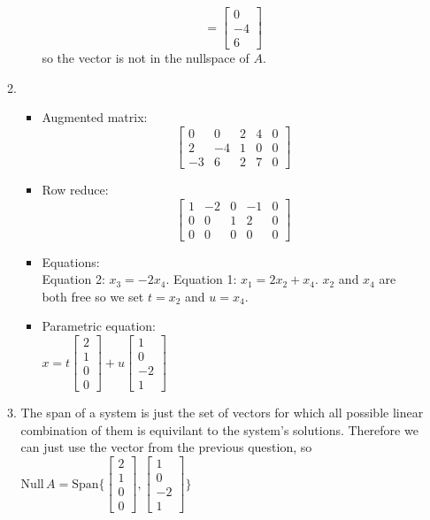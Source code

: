 \documentclass[12pt,a4paper]{exam}
\newcommand{\Nul}{\mathrm{Null\,}}
\newcommand{\Span}{\mathrm{Span}}
\begin{document}
\begin{enumerate}
\begin{solution}
\begin{enumerate}
\begin{enumerate}
\[          =
          \left[\begin{matrix} 0 \\ -4 \\ 6 \end{matrix}\right]
          \] so the vector is not in the nullspace of $A$.
      \end{enumerate}
    \item
    \begin{itemize}
      \item Augmented matrix:\\
        \[ \left[ \begin{matrix}
            0 & 0 & 2 & 4 & 0\\
            2 & -4 & 1 & 0 & 0\\
            -3 & 6 & 2 & 7 & 0
         \end{matrix} \right] \]
      \item Row reduce:\\
        \[ \left[ \begin{matrix}
            1 & -2 & 0 & -1 & 0\\
            0 & 0 & 1 & 2 & 0\\
            0 & 0 & 0 & 0 & 0
         \end{matrix} \right] \]
      \item Equations:\\
        Equation 2: $x_3=-2x_4$. 
        Equation 1: $x_1=2x_2+x_4$. 
        $x_2$ and $x_4$ are both free so we set $t=x_2$ and $u=x_4$.
      \item Parametric equation:\\
        $x=t\left[\begin{array}{c} 2 \\ 1 \\ 0 \\ 0 \end{array}\right] + u\left[\begin{array}{c} 1 \\ 0 \\ -2 \\ 1 \end{array}\right]$\\
    \end{itemize}
    \item The span of a system is just the set of vectors for which all possible linear combination of them is
          equivilant to the system's solutions. Therefore we can just use the vector from the previous question,
          so $\Nul A = \Span \{\left[\begin{array}{c} 2 \\ 1 \\ 0 \\ 0 \end{array}\right], \left[\begin{array}{c} 1 \\ 0 \\ -2 \\ 1 \end{array}\right]\}$

\end{enumerate}
\end{solution}
\end{enumerate}
\end{document}

